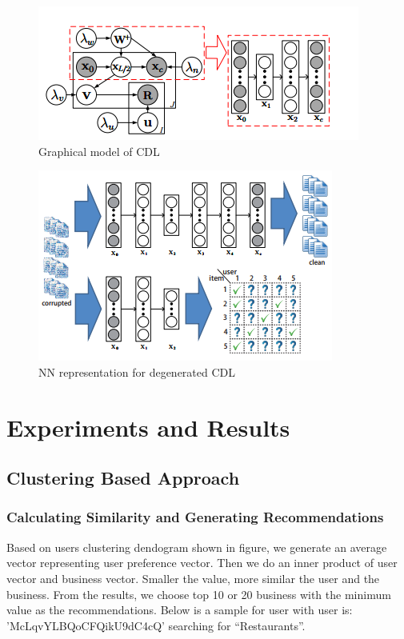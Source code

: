 \documentclass[11pt]{article}
\begin{document}
		\begin{figure}[H]
			\centering
			\includegraphics[scale=0.7]{cdl.png}
			\caption{Graphical model of CDL}
		\end{figure}
		\begin{figure}[H]
			\centering
			\includegraphics[scale=0.7]{cdl1.png}
			\caption{NN representation for degenerated CDL}
		\end{figure}
	\section{Experiments and Results}
	\subsection{Clustering Based Approach}
	\subsubsection{Calculating Similarity and Generating Recommendations}
	Based on users clustering dendogram shown in figure, we generate an average vector representing user preference vector. Then we do an inner product of user vector and business vector. Smaller the value, more similar the user and the business. From the results, we choose top 10 or 20 business with the minimum value as the recommendations. Below is a sample for user with user is: 'McLqvYLBQoCFQikU9dC4cQ' searching for “Restaurants”.
\end{document}
